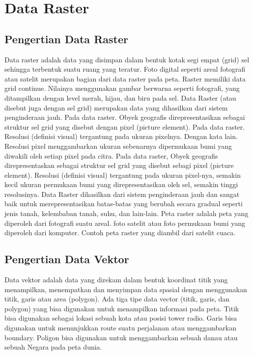 
\section{Data Raster}
\subsection{Pengertian Data Raster}
Data raster adalah data yang disimpan dalam bentuk kotak segi empat (grid) sel sehingga terbentuk suatu ruang yang 
teratur. Foto digital seperti areal fotografi atau satelit merupakan bagian dari data raster pada peta. 
Raster memiliki data grid continue. Nilainya menggunakan gambar berwarna seperti fotografi, yang ditampilkan dengan 
level merah, hijau, dan biru pada sel. Data Raster (atau disebut juga dengan sel grid) merupakan data yang 
dihasilkan dari sistem penginderaan jauh. Pada data raster. Obyek geografis direpresentasikan sebagai struktur
sel grid yang disebut dengan pixel (picture element). Pada data raster. Resolusi (definisi visual) tergantung
pada ukuran pixelnya. Dengan kata lain. Resolusi pixel menggambarkan ukuran sebenarnya dipermukaan bumi 
yang diwakili oleh setiap pixel pada citra. Pada data raster, Obyek geografis direpresentaskan sebagai struktur sel grid yang disebut sebagi pixel (picture element). Resolusi (definisi visual) tergantung pada ukuran pixel-nya, semakin kecil ukuran permukaan bumi yang direpresentasikan oleh sel, semakin tinggi resolusinya. Data Raster dihasilkan dari sistem penginderaan jauh dan sangat baik untuk merepresentasikan batas-batas yang berubah secara gradual seperti jenis tanah, kelembaban tanah, suhu, dan lain-lain. Peta raster adalah peta yang diperoleh dari fotografi suatu areal. foto satelit atau foto permukaan bumi yang diperoleh dari komputer. Contoh peta raster yang diambil dari satelit cuaca.\cite{puntodewo2003sistem}

\subsection{Pengertian Data Vektor}
Data vektor adalah data yang direkam dalam bentuk koordinat titik yang menampilkan, 
menempatkan dan menyimpan data spasial dengan menggunakan titik, 
garis atau area (polygon). Ada tiga tipe data vector (titik, garis, 
dan polygon) yang bisa digunakan untuk menampilkan informasi pada peta. 
Titik bisa digunakan sebagai lokasi sebuah kota atau posisi tower radio. 
Garis bisa digunakan untuk menunjukkan route suatu perjalanan atau menggambarkan boundary. 
Poligon bisa digunakan untuk menggambarkan sebuah danau atau sebuah Negara pada peta dunia.

